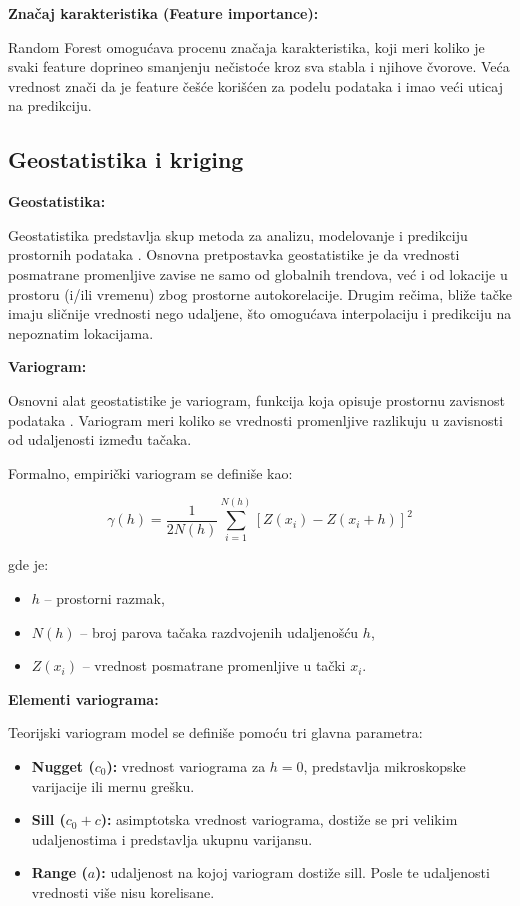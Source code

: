 \documentclass[12pt]{article}
\begin{document}
\textbf{Značaj karakteristika (Feature importance):}

Random Forest omogućava procenu značaja karakteristika, koji meri koliko je svaki feature doprineo smanjenju nečistoće kroz sva stabla i njihove čvorove. Veća vrednost znači da je feature češće korišćen za podelu podataka i imao veći uticaj na predikciju.

\subsection{Geostatistika i kriging}

\textbf{Geostatistika:}

Geostatistika predstavlja skup metoda za analizu, modelovanje i predikciju prostornih podataka \cite{cressie1993statistics, isaaks1989applied}. Osnovna pretpostavka geostatistike je da vrednosti posmatrane promenljive zavise ne samo od globalnih trendova, već i od lokacije u prostoru (i/ili vremenu) zbog prostorne autokorelacije. Drugim rečima, bliže tačke imaju sličnije vrednosti nego udaljene, što omogućava interpolaciju i predikciju na nepoznatim lokacijama.

\textbf{Variogram:}

Osnovni alat geostatistike je variogram, funkcija koja opisuje prostornu zavisnost podataka \cite{chiles2012geostatistics}. Variogram meri koliko se vrednosti promenljive razlikuju u zavisnosti od udaljenosti između tačaka.

Formalno, empirički variogram se definiše kao:

\begin{equation}
\gamma(h) = \frac{1}{2N(h)} \sum_{i=1}^{N(h)} [Z(x_i) - Z(x_i + h)]^2
\end{equation}

gde je:
\begin{itemize}
    \item $h$ -- prostorni razmak,
    \item $N(h)$ -- broj parova tačaka razdvojenih udaljenošću $h$,
    \item $Z(x_i)$ -- vrednost posmatrane promenljive u tački $x_i$.
\end{itemize}

\textbf{Elementi variograma:}

Teorijski variogram model se definiše pomoću tri glavna parametra:

\begin{itemize}
    \item \textbf{Nugget ($c_0$):} vrednost variograma za $h=0$, predstavlja mikroskopske varijacije ili mernu grešku.
    \item \textbf{Sill ($c_0 + c$):} asimptotska vrednost variograma, dostiže se pri velikim udaljenostima i predstavlja ukupnu varijansu.
    \item \textbf{Range ($a$):} udaljenost na kojoj variogram dostiže sill. Posle te udaljenosti vrednosti više nisu korelisane.
\end{itemize}
\end{document}
